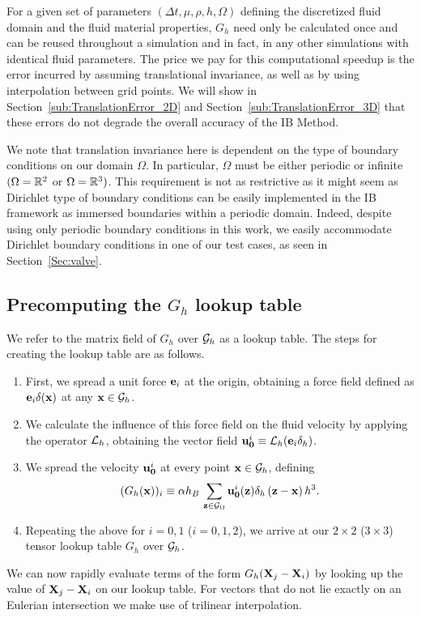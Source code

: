 For a given set of parameters $(\Delta t, \mu, \rho, h, \Omega)$ defining the discretized fluid domain and the fluid material properties, $G_h$ need only be calculated once and can be reused throughout a simulation and in fact,  in any other simulations with identical fluid parameters. The price we pay for this computational speedup is the error incurred by assuming translational invariance, as well as by using interpolation between grid points. We will show in Section~\ref{sub:TranslationError_2D} and Section~\ref{sub:TranslationError_3D} that these errors do not degrade the overall accuracy of the IB Method.

We note that translation invariance here is dependent on the type of boundary conditions on our domain $\Omega$. In particular, $\Omega$ must be either periodic or infinite $(\Omega = \mathbb{R}^2$ or $\Omega = \mathbb{R}^3)$. This requirement is not as restrictive as it might seem as Dirichlet type of boundary conditions can be  easily implemented in the IB framework as immersed boundaries within a periodic domain. Indeed, despite using only periodic boundary conditions in this work, we easily accommodate Dirichlet boundary conditions in one of our test cases, as seen in Section~\ref{Sec:valve}.


\subsection{Precomputing the $G_h$ lookup table}
We refer to the matrix field of $G_h$ over $\mathcal{G}_h$ as a lookup table. The steps for creating the lookup table are as follows.
\begin{enumerate}
\item
First, we spread a unit force $\mathbf{e}_i$ at the origin, obtaining a force field defined as $\mathbf{e}_i \delta(\mathbf{x})$ at any $\mathbf{x}\in\mathcal{G}_h$.
\item
We calculate the influence of this force field on the fluid velocity by applying the operator $\mathcal{L}_h$, obtaining the vector field $\mathbf{u}_{\mathbf{0}}^i \equiv \mathcal{L}_h( \mathbf{e}_i \delta_h )$.
\item
We spread the velocity $\mathbf{u}_{\mathbf{0}}^i$ at every point $\mathbf{x}\in \mathcal{G}_h$, defining
\begin{equation}
(G_h(\mathbf{x}))_i \equiv \alpha h_B \, \sum_{\mathbf{z} \in \mathcal{G}_\Omega} \mathbf{u}_{\mathbf{0}}^i(\mathbf{z}) \delta_h\left(\mathbf{z}-\mathbf{x}\right)h^3.
\end{equation}
\item
Repeating the above for $i=0,1$ ($i=0,1,2$), we arrive at our $2\times 2$ ($3\times 3$) tensor lookup table $G_h$ over $\mathcal{G}_h$.
\end{enumerate}
We can now rapidly evaluate terms of the form $G_h(\mathbf{X}_j - \mathbf{X}_i)$ by looking up the value of $\mathbf{X}_j - \mathbf{X}_i$ on our lookup table. For vectors that do not lie exactly on an Eulerian intersection we make use of trilinear interpolation.





